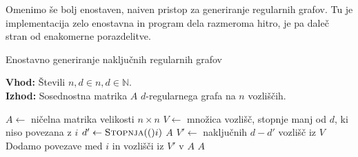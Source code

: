Omenimo še bolj enostaven, naiven pristop za generiranje regularnih grafov. Tu je implementacija zelo enostavna in program dela razmeroma hitro, je pa daleč stran od enakomerne porazdelitve.

\begin{algorithm}[ht]
    \caption{Enostavno generiranje naključnih regularnih grafov}
    \label{enakomerno-nakljucni-hitro}
    \raggedright
    \textbf{Vhod:} Števili \(n, d \in n, d \in \mathbb N\). \\
    \textbf{Izhod:} Sosednostna matrika \(A\) \(d\)-regularnega grafa na \(n\) vozliščih.
    \begin{algorithmic}[1]
        \State \(A \gets\) ničelna matrika velikosti \(n \times n\)
        \State \(V \gets \) množica vozlišč, stopnje manj od \(d\), ki niso povezana z \(i\)
        \State \(d' \gets \Call{Stopnja}(i)\)
        \State \Return \(A\)
        \EndIf
        \State \(V' \gets \) naključnih \(d-d'\) vozlišč iz \(V\)
        \State Dodamo povezave med \(i\) in vozlišči iz \(V'\) v \(A\)
        \EndFor
        \State \Return $A$
        \EndFunction
    \end{algorithmic}
\end{algorithm}

